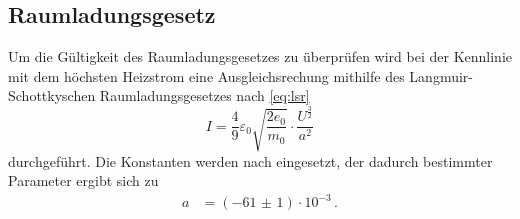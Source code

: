 \subsection{Raumladungsgesetz}

Um die Gültigkeit des Raumladungsgesetzes zu überprüfen wird bei der Kennlinie mit
dem höchsten Heizstrom eine Ausgleichsrechung mithilfe des Langmuir-Schottkyschen
Raumladungsgesetzes nach \autoref{eq:lsr}
\begin{equation*}
  I= \frac{4}{9} \varepsilon_{0} \sqrt{\frac{2 e_{0}}{m_{0}}} \cdot \frac{U^{\frac{3}{2}}}{a^2}
\end{equation*}
durchgeführt. 
Die Konstanten werden nach \cite{constants} eingesetzt, der dadurch bestimmter Parameter ergibt sich zu 
\begin{align*}
  a &= (\num{-61(1)}) \cdot 10^{-3} \, . \\
\end{align*}
